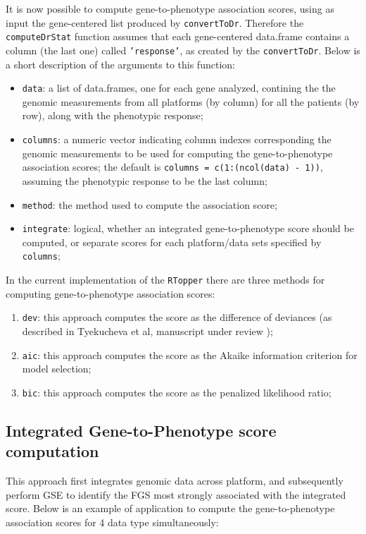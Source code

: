\documentclass[11pt]{article}
\newcommand{\Rfunction}[1]{{\texttt{#1}}}
\newcommand{\Rpackage}[1]{{\texttt{#1}}}
\newcommand{\Rmethod}[1]{{\texttt{#1}}}
\newcommand{\Rfunarg}[1]{{\texttt{#1}}}
\begin{document}
It is now possible to compute gene-to-phenotype association scores, using as input the
gene-centered list produced by \Rfunction{convertToDr}.
Therefore the \Rfunction{computeDrStat} function assumes that each gene-centered 
data.frame contains a column (the last one) called \texttt{'response'}, 
as created by the \Rfunction{convertToDr}.
Below is a short description of the arguments to this function:

\begin{itemize}
  \item \Rfunarg{data}: a list of data.frames, one for each gene analyzed, contining the the genomic
    measurements from all platforms (by column) for all the patients (by row), along with the phenotypic
    response;
  \item \Rfunarg{columns}: a numeric vector indicating column indexes corresponding the genomic measurements
    to be used for computing the gene-to-phenotype association scores;
    the default is \texttt{columns = c(1:(ncol(data) - 1))}, assuming the phenotypic response to be the last
    column;
  \item \Rfunarg{method}: the method used to compute the association score;
  \item \Rfunarg{integrate}: logical, whether an integrated gene-to-phenotype score should be computed,
    or separate scores for each platform/data sets specified by \Rfunarg{columns};
  \end{itemize}

In the current implementation of the \Rpackage{RTopper} there are three methods for computing 
gene-to-phenotype association scores:
\begin{enumerate}
  \item \Rmethod{dev}: this approach computes the score as the difference of deviances
    (as described in Tyekucheva et al, manuscript under review \cite{Tyekucheva2011});
  \item \Rmethod{aic}: this approach computes the score as the Akaike information criterion
    for model selection;
  \item \Rmethod{bic}: this approach computes the score as the penalized likelihood ratio;
\end{enumerate}

\subsection{Integrated Gene-to-Phenotype score computation}
This approach first integrates genomic data across platform, and subsequently
perform GSE to identify the FGS most strongly associated with the integrated score.
Below is an example of application to compute the gene-to-phenotype association
scores for 4 data type simultaneously:
\end{document}
